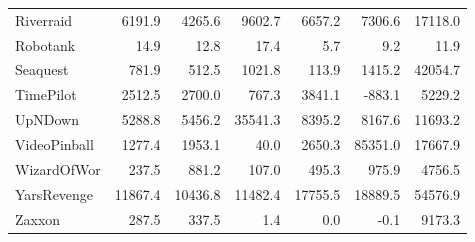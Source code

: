 \begin{table}[h]
{\begin{tabular}{lrrrrrr}
Riverraid      &     6191.9 &    4265.6 &                 9602.7 &    6657.2 &          7306.6 &  17118.0 \\
Robotank       &       14.9 &      12.8 &                   17.4 &       5.7 &             9.2 &     11.9 \\
Seaquest       &      781.9 &     512.5 &                 1021.8 &     113.9 &          1415.2 &  42054.7 \\
TimePilot      &     2512.5 &    2700.0 &                  767.3 &    3841.1 &          -883.1 &   5229.2 \\
UpNDown        &     5288.8 &    5456.2 &                35541.3 &    8395.2 &          8167.6 &  11693.2 \\
VideoPinball   &     1277.4 &    1953.1 &                   40.0 &    2650.3 &         85351.0 &  17667.9 \\
WizardOfWor    &      237.5 &     881.2 &                  107.0 &     495.3 &           975.9 &   4756.5 \\
YarsRevenge    &    11867.4 &   10436.8 &                11482.4 &   17755.5 &         18889.5 &  54576.9 \\
Zaxxon         &      287.5 &     337.5 &                    1.4 &       0.0 &            -0.1 &   9173.3 \\
\bottomrule
\end{tabular}}
\end{table}


